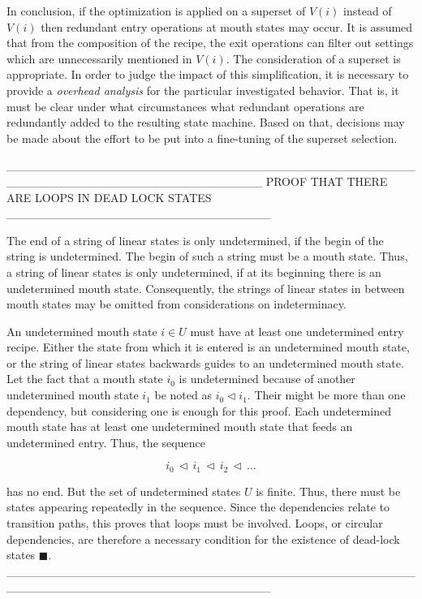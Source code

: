 \documentclass[12pt,a4paper]{scrartcl}
\begin{document}
In conclusion, if the optimization is applied on a superset of $V(i)$ instead
of $V(i)$ then redundant entry operations at mouth states may occur. It is
assumed that from the composition of the recipe, the exit operations can filter
out settings which are unnecessarily mentioned in $V(i)$. The consideration of
a superset is appropriate. In order to judge the impact of this simplification,
it is necessary to provide a \textit{overhead analysis} for the particular
investigated behavior. That is, it must be clear under what circumstances what
redundant operations are redundantly added to the resulting state machine.
Based on that, decisions may be made about the effort to be put into a
fine-tuning of the superset selection.

______________________________________________________________________________
PROOF THAT THERE ARE LOOPS IN DEAD LOCK STATES _______________________________

The end of a string of linear states is only undetermined, if the begin of the
string is undetermined. The begin of such a string must be a mouth state. Thus,
a string of linear states is only undetermined, if at its beginning there is an
undetermined mouth state. Consequently, the strings of linear states in between
mouth states may be omitted from considerations on indeterminacy.

An undetermined mouth state $i \in U$ must have at least one undetermined entry
recipe. Either the state from which it is entered is an undetermined mouth state, 
or the string of linear states backwards guides to an undetermined mouth state. 
Let the fact that a mouth state $i_0$ is undetermined because of another
undetermined mouth state $i_1$ be noted as $i_0 \vartriangleleft i_1$. Their might
be more than one dependency, but considering one is enough for this proof. Each
undetermined mouth state has at least one undetermined mouth state that feeds
an undetermined entry. Thus, the sequence 

\begin{equation}
    i_0\,\vartriangleleft\,i_1\,\vartriangleleft\,i_2\,\vartriangleleft\,\ldots
\end{equation}

has no end. But the set of undetermined states $U$ is finite. Thus, there must
be states appearing repeatedly in the sequence. Since the dependencies relate
to transition paths, this proves that loops must be involved. Loops, or circular
dependencies, are therefore a necessary condition for the existence of
dead-lock states $\blacksquare$. 
_______________________________________________________________________________
\end{document}
